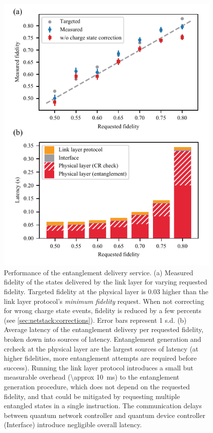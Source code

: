 \begin{figure}[t]
    \centering
    \includegraphics[width=0.6\linewidth]{figures/latencyvsfid.pdf}
    \caption{
        Performance of the entanglement delivery service.
        (a) Measured fidelity of the states delivered by the link layer for varying requested
        fidelity. Targeted fidelity at the physical layer is 0.03 higher than the link layer
        protocol's \emph{minimum fidelity} request. When not correcting for wrong charge state
        events, fidelity is reduced by a few percents (see \cref{sec:netstack:corrections}). Error
        bars represent \num{1} s.d.
        (b) Average latency of the entanglement delivery per requested fidelity, broken down into
        sources of latency. Entanglement generation and \acrlong{crcheck} at the physical layer are
        the largest sources of latency (at higher fidelities, more entanglement attempts are
        required before success). Running the link layer protocol introduces a small but measurable
        overhead (\qty{\approx 10}{ms}) to the entanglement generation procedure, which does not
        depend on the requested fidelity, and that could be mitigated by requesting multiple
        entangled states in a single instruction. The communication delays between quantum network
        controller and quantum device controller (Interface) introduce negligible overall latency.
    }
    \label{fig:latencyvsfid}
\end{figure}

